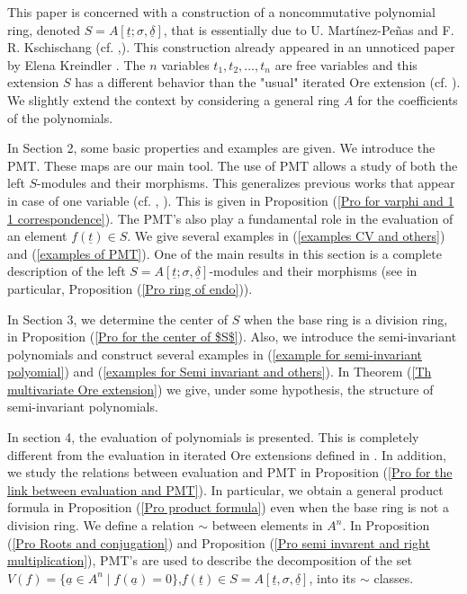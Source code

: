 \documentclass[12pt,a4paper]{article}
\newcommand{\si}{\sigma}
\newcommand{\ut}{\underline{t}}
\newcommand{\ua}{\underline{a}}
\newcommand{\ud}{\underline{\delta}}
\begin{document}
	This paper is concerned with a construction of a noncommutative polynomial ring, denoted $S=A[\ut;\sigma,\ud]$, that is essentially due to U. Mart\'i{n}ez-Pe\~nas and F. R.
	Kschischang (cf. \cite{MP2019},\cite{MP2022}).  This construction already appeared in an unnoticed paper by 
	Elena Kreindler \cite{K}.   The $n$ variables $t_1,t_2,\dots,t_n$ are free variables and this extension $S$  has a different behavior than the "usual" iterated Ore extension (cf. \cite{BL2023}).  We slightly extend the context by  considering a general ring $A$ for the coefficients of the polynomials.  

	 In Section 2, some basic properties and examples are given.
		  We introduce the PMT.   These maps are 
		  our main tool.  The 
		  use of PMT allows a study of both the 
		  left $S$-modules and their morphisms.   
		  This generalizes previous works that 
		  appear in case of one variable (cf. \cite{L2012}, \cite{L 1995}).  This is given in Proposition (\ref{Pro for varphi and 1 1 
		  correspondence}).  The PMT's also play a fundamental role in the evaluation of an 
	  element $f(\ut)\in S$. We give several 
	  examples in (\ref{examples CV and others}) and  (\ref{examples of PMT}).  One of the main results in this section is a complete description of the left $S=A[\ut; \sigma, \ud]$-modules and their morphisms (see in particular, Proposition (\ref{Pro ring of endo})). 
	  
	  In Section 3, we  determine the center of $S$ when the base ring is a division ring, in Proposition (\ref{Pro for 
	  	the center of $S$}). Also, we introduce the semi-invariant polynomials and construct several examples in  (\ref{example for semi-invariant polyomial}) and (\ref{examples for Semi invariant and others}). 
	In Theorem (\ref{Th multivariate Ore extension}) we give, under some hypothesis, the structure of semi-invariant polynomials. 
	 
	  In section 4, the evaluation of polynomials is presented. This is completely different from the evaluation in iterated Ore extensions defined in \cite{BL2023}. In addition, we study the relations between evaluation and PMT in Proposition (\ref{Pro for the link between evaluation and PMT}). 
	  In particular, we obtain a general product formula in Proposition (\ref{Pro product formula}) even when the base ring is not a division ring. We define a relation $\sim$ between elements in $A^n$. In Proposition (\ref{Pro Roots and conjugation}) and Proposition (\ref{Pro semi invarent and right multiplication}), PMT's are used to describe the decomposition of the set $V(f)=\{\ua \in A^n \mid f(\ua)=0\}$,$f(\ut)\in S=A[\ut,\si,\ud]$, into its $ \sim $ classes. 
	
\end{document}

